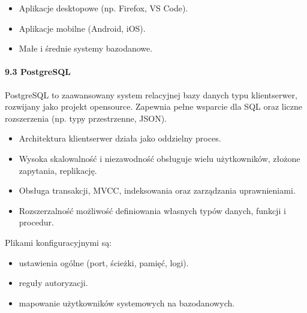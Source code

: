 \documentclass[letterpaper,10pt,polish]{sphinxmanual}
\begin{document}
\sphinxAtStartPar
{}
\begin{itemize}
\item {} 
\sphinxAtStartPar
Aplikacje desktopowe (np. Firefox, VS Code).

\item {} 
\sphinxAtStartPar
Aplikacje mobilne (Android, iOS).

\item {} 
\sphinxAtStartPar
Małe i średnie systemy bazodanowe.

\end{itemize}


\paragraph{9.3 PostgreSQL}
\label{\detokenize{rozdzial2/Konfiguracja_baz_danych/Konfiguracja_baz_danych:postgresql}}
\sphinxAtStartPar
PostgreSQL to zaawansowany system relacyjnej bazy danych typu klient\sphinxhyphen{}serwer, rozwijany jako projekt open\sphinxhyphen{}source. Zapewnia pełne wsparcie dla SQL oraz liczne rozszerzenia (np. typy przestrzenne, JSON).

\sphinxAtStartPar
{}
\begin{itemize}
\item {} 
\sphinxAtStartPar
Architektura klient\sphinxhyphen{}serwer \textendash{} działa jako oddzielny proces.

\item {} 
\sphinxAtStartPar
Wysoka skalowalność i niezawodność \textendash{} obsługuje wielu użytkowników, złożone zapytania, replikację.

\item {} 
\sphinxAtStartPar
Obsługa transakcji, MVCC, indeksowania oraz zarządzania uprawnieniami.

\item {} 
\sphinxAtStartPar
Rozszerzalność \textendash{} możliwość definiowania własnych typów danych, funkcji i procedur.

\end{itemize}

\sphinxAtStartPar
{}
Plikami konfiguracyjnymi są:
\begin{itemize}
\item {} 
\sphinxAtStartPar
{} \textendash{} ustawienia ogólne (port, ścieżki, pamięć, logi).

\item {} 
\sphinxAtStartPar
{} \textendash{} reguły autoryzacji.

\item {} 
\sphinxAtStartPar
{} \textendash{} mapowanie użytkowników systemowych na bazodanowych.

\end{itemize}
\end{document}
